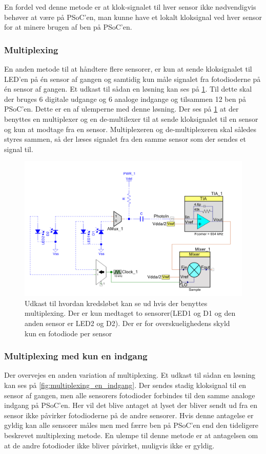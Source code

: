 \documentclass[HardwareDesign/HardwareDesign_main.tex]{subfiles}
\begin{document}
 En fordel ved denne metode er at klok-signalet til hver sensor ikke nødvendigvis behøver at være på PSoC'en, man kunne have et lokalt kloksignal ved hver sensor for at minere brugen af ben på PSoC'en.

\subsubsection{Multiplexing}
En anden metode til at håndtere flere sensorer, er kun at sende kloksignalet til LED'en på én sensor af gangen og samtidig kun måle signalet fra fotodioderne på én sensor af gangen. Et udkast til sådan en løsning kan ses på \ref{fig:multiplexing}. Til dette skal der bruges 6 digitale udgange og 6 analoge indgange og tilsammen 12 ben på PSoC'en. Dette er en af ulemperne med denne løsning. Der ses på \ref{fig:multiplexing} at der benyttes en multiplexer og en de-multilexer til at sende kloksignalet til en sensor og kun at modtage fra en sensor. Multiplexeren og de-multiplexeren skal således styres sammen, så der læses signalet fra den samme sensor som der sendes et signal til.

\begin{figure}[H]
    \centering
    \includegraphics[width=1\textwidth]{HardwareDesign/CupSensor/graphics/Multiplexing.PNG}
    \caption{Udkast til hvordan kredsløbet kan se ud hvis der benyttes multiplexing. Der er kun medtaget to sensorer(LED1 og D1 og den anden sensor er LED2 og D2). Der er for overskuelighedens skyld kun en fotodiode per sensor}
    \label{fig:multiplexing}
\end{figure}

\subsubsection{Multiplexing med kun en indgang}
Der overvejes en anden variation af multiplexing. Et udkast til sådan en løsning kan ses på \ref{fig:multiplexing_en_indgang}. Der sendes stadig kloksignal til en sensor af gangen, men alle sensorers fotodioder forbindes til den samme analoge indgang på PSoC'en. Her vil det blive antaget at lyset der bliver sendt ud fra en sensor ikke påvirker fotodioderne på de andre sensorer. Hvis denne antagelse er gyldig kan alle sensorer måles men med færre ben på PSoC'en end den tideligere beskrevet multiplexing metode. En ulempe til denne metode er at antagelsen om at de andre fotodioder ikke bliver påvirket, muligvis ikke er gyldig.
\end{document}
